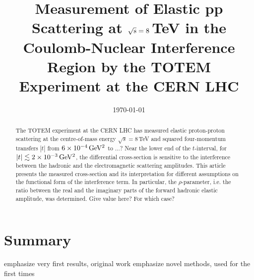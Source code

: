 \documentclass[pdftex,twocolumn,epjc3]{svjour3}
\def\todo#1{{\color{red} #1}}
\def\hang{\hangindent=\parindent}
\def\>{\par\vskip\itskip\parindent\itindent\indent\hang\llap{\hbox to3mm{$\bullet$\hss}}}
\def\>E{\par\vskip\itskip\parindent\itindent\indent\hang\llap{\hbox to3mm{\hss}}}
\def\>>{\par\vskip\iitskip\parindent\iitindent\indent\hang\llap{\hbox to\iitindent{\hss--\ }}}
\begin{document}
\title{Measurement of Elastic pp Scattering at $\sqrt{\hbox{s}} = \hbox{8}$\,TeV in the 
Coulomb-Nuclear Interference Region by the TOTEM Experiment at the CERN LHC}




\date{\today}

\maketitle

\begin{abstract}
The TOTEM experiment at the CERN LHC has measured elastic proton-proton 
scattering at the centre-of-mass energy 
$\sqrt{s}=8\,$TeV and squared four-momentum transfers $|t|$ from $6\times10^{-4}\,\rm GeV^{2}$ to ...?
Near the lower end of the $t$-interval, for
$|t| \lesssim 2\times10^{-3}\,\rm GeV^{2}$, the differential cross-section is 
sensitive to the 
interference between the hadronic and the electromagnetic scattering amplitudes.
This article presents the measured cross-section and its interpretation for 
different assumptions on the functional form of the interference term. In 
particular, the $\rho$-parameter, i.e. the ratio between the real and the 
imaginary parts of the forward hadronic elastic amplitude, was determined.
\todo{Give value here? For which case?}

\end{abstract}













\section{Summary}

\> emphasize very first results, original work
\> emphasize novel methods, used for the first times
\end{document}
